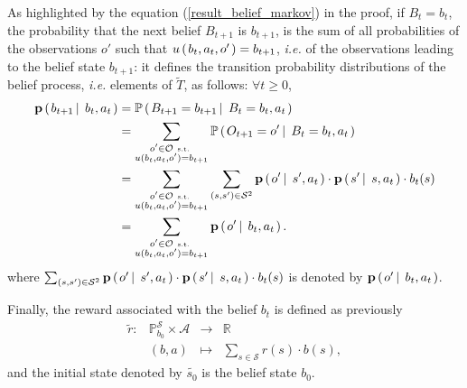 As highlighted by the equation (\ref{result_belief_markov}) in the proof, 
if $B_t=b_t$, the probability that the next belief $B_{t+1}$ is $b_{t+1}$, 
is the sum of all probabilities of the observations $o'$
such that $u \left( \left. b_t,a_t,o' \right. \right)=b_{t+1}$, \textit{i.e.}
of the observations leading to the belief state $b_{t+1}$: 
it defines the transition probability distributions of the belief process,
\textit{i.e.} elements of $\tilde{T}$, as follows: $\forall t \geqslant 0$,
\begin{align}
\nonumber \textbf{p} \left( \left.  b_{t+1} \, \right| \left. \, b_t,a_t \right. \right) &= \mathbb{P} \left( \left.  B_{t+1} = b_{t+1} \, \right| \left. \, B_t=b_t, a_t  \right. \right) \\
\nonumber &= \sum_{\substack{ o' \in \mathcal{O} \mbox{ \tiny s.t. } \\ u(b_t,a_{t},o') = b_{t+1}} } \mathbb{P} \left( \left.  O_{t+1} = o' \, \right| \left. \, B_t=b_t, a_t \right. \right) \\
\label{belief_transition} &= \sum_{ \substack{ o' \in \mathcal{O} \mbox{ \tiny s.t. } \\ u(b_t,a_t,o') = b_{t+1}} } \sum_{(s,s') \in \mathcal{S}^2}\textbf{p} \left( \left.  o' \, \right| \left. \, s', a_t  \right. \right) \cdot \textbf{p} \left( \left.  s' \, \right| \left. \, s, a_t  \right. \right) \cdot b_t(s)\\
\nonumber &= \sum_{ \substack{ o' \in \mathcal{O} \mbox{ \tiny s.t. } \\ u(b_t,a_t,o') = b_{t+1}} } \textbf{p} \left( \left.  o' \, \right| \left. \, b_t, a_t  \right. \right).
\end{align}
where $\sum_{(s,s') \in \mathcal{S}^2}\textbf{p} \left( \left.  o' \, \right| \left. \, s', a_t  \right. \right) \cdot \textbf{p} \left( \left.  s' \, \right| \left. \, s, a_t  \right. \right) \cdot b_t(s)$ is denoted by 
$\textbf{p} \left( \left.  o' \, \right| \left. \, b_t, a_t  \right. \right)$.

Finally, the reward associated with the belief $b_t$ is defined as previously
\begin{equation}
\label{belief_reward} \begin{array}{ccccc} \tilde{r}: & \mathbb{P}^{\mathcal{S}}_{b_0}  \times \mathcal{A} & \rightarrow & \mathbb{R} \\ 
						& (b,a) & \mapsto & \sum_{s \in \mathcal{S}} r(s) \cdot b(s),
\end{array}
\end{equation} 
and the initial state denoted by $\tilde{s_0}$ is the belief state $b_0$.


